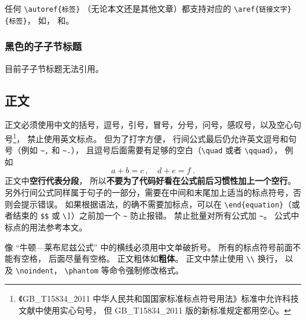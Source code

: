 任何 \verb`\autoref{标签}` （无论本文还是其他文章）都支持对应的 \verb`\aref{链接文字}{标签}`， 如， 和。

\subsubsection{黑色的子子节标题}
目前子子节标题无法引用。

\subsection{正文}\label{sub_Sample_16}
正文必须使用中文的括号，逗号，引号，冒号，分号，问号，感叹号，以及空心句号\footnote{《GB\_T15834\_2011 中华人民共和国国家标准标点符号用法》标准中允许科技文献中使用实心句号， 但 GB\_T15834\_2011 版的新标准规定都用空心。}， 禁止使用英文标点。 但为了打字方便， 行间公式最后仍允许英文逗号和句号（例如 \verb|~,| 和 \verb|~.|）， 且逗号后面需要有足够的空白（\verb|\quad| 或者 \verb|\qquad|）， 例如
\begin{equation}\label{eq_Sample_2}
a + b = c~, \quad d + e = f~.
\end{equation}
正文中\textbf{空行代表分段}， 所以\textbf{不要为了代码好看在公式前后习惯性加上一个空行}。 另外行间公式同样属于句子的一部分，需要在中间和末尾加上适当的标点符号，否则会提示错误。 如果根据语法，的确不需要加标点，可以在 \verb|\end{equation}|（或者结束的 \verb`$$` 或 \verb`\]`）之前加一个 \verb|~| 防止报错。 禁止批量对所有公式加 \verb|~|。 公式中标点的用法参考本文。

像 “牛顿—莱布尼兹公式” 中的横线必须用中文单破折号。 所有的标点符号前面不能有空格， 后面尽量有空格。 正文粗体如\textbf{粗体}。 正文中禁止使用 \verb|\\| 换行， 以及 \verb|\noindent|， \verb|\phantom| 等命令强制修改格式。

